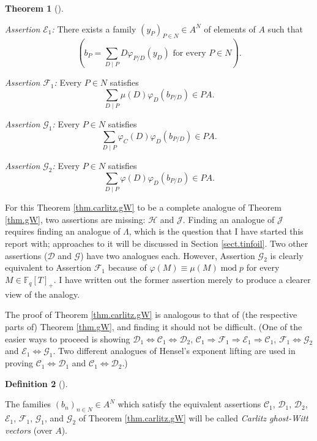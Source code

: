 \documentclass[numbers=enddot,12pt,final,onecolumn,notitlepage]{scrartcl}%
\theoremstyle{definition}
\newtheorem{theo}{Theorem}[section]
\newenvironment{theorem}[1][]
{\begin{theo}[#1]\begin{leftbar}}
{\end{leftbar}\end{theo}}
\newtheorem{defi}[theo]{Definition}
\newenvironment{definition}[1][]
{\begin{defi}[#1]\begin{leftbar}}
{\end{leftbar}\end{defi}}
\let\sumnonlimits\sum
\renewcommand{\sum}{\sumnonlimits\limits}
\begin{document}
\begin{theorem}
\textit{Assertion }$\mathcal{E}_{1}$\textit{:} There exists a family $\left(
y_{P}\right)  _{P\in N}\in A^{N}$ of elements of $A$ such that%
\[
\left(  b_{P}=\sum_{D\mid P}D\varphi_{P / D}\left(  y_{D}\right)  \text{ for
every }P\in N\right)  .
\]


\textit{Assertion }$\mathcal{F}_{1}$\textit{:} Every $P\in N$ satisfies%
\[
\sum_{D\mid P}\mu\left(  D\right)  \varphi_{D}\left(  b_{P / D}\right)  \in
PA.
\]


\textit{Assertion }$\mathcal{G}_{1}$\textit{:} Every $P\in N$ satisfies%
\[
\sum_{D\mid P}\varphi_{C}\left(  D\right)  \varphi_{D}\left(  b_{P /
D}\right)  \in PA.
\]


\textit{Assertion }$\mathcal{G}_{2}$\textit{:} Every $P\in N$ satisfies%
\[
\sum_{D\mid P}\varphi\left(  D\right)  \varphi_{D}\left(  b_{P / D}\right)
\in PA.
\]

\end{theorem}

For this Theorem \ref{thm.carlitz.gW} to be a complete analogue of Theorem
\ref{thm.gW}, two assertions are missing: $\mathcal{H}$ and $\mathcal{J}$.
Finding an analogue of $\mathcal{J}$ requires finding an analogue of $\Lambda
$, which is the question that I have started this report with; approaches to
it will be discussed in Section \ref{sect.tinfoil}. Two other assertions
($\mathcal{D}$ and $\mathcal{G}$) have two analogues each. However, Assertion
$\mathcal{G}_{2}$ is clearly equivalent to Assertion $\mathcal{F}_{1}$ because
of $\varphi\left(  M\right)  \equiv\mu\left(  M\right)  \operatorname{mod}p$
for every $M\in\mathbb{F}_{q}\left[  T\right]  _{+}$. I have written out the
former assertion merely to produce a clearer view of the analogy.

The proof of Theorem \ref{thm.carlitz.gW} is analogous to that of (the
respective parts of) Theorem \ref{thm.gW}, and finding it should not be
difficult. (One of the easier ways to proceed is showing $\mathcal{D}%
_{1}\Longleftrightarrow\mathcal{C}_{1}\Longleftrightarrow\mathcal{D}_{2}$,
$\mathcal{C}_{1}\Longrightarrow\mathcal{F}_{1}\Longrightarrow\mathcal{E}%
_{1}\Longrightarrow\mathcal{C}_{1}$, $\mathcal{F}_{1}\Longleftrightarrow
\mathcal{G}_{2}$ and $\mathcal{E}_{1}\Longleftrightarrow\mathcal{G}_{1}$. Two
different analogues of Hensel's exponent lifting are used in proving
$\mathcal{C}_{1}\Longleftrightarrow\mathcal{D}_{1}$ and $\mathcal{C}%
_{1}\Longleftrightarrow\mathcal{D}_{2}$.)

\begin{definition}
The families $\left(  b_{n}\right)  _{n\in N}\in A^{N}$ which satisfy the
equivalent assertions $\mathcal{C}_{1}$, $\mathcal{D}_{1}$, $\mathcal{D}_{2}$,
$\mathcal{E}_{1}$, $\mathcal{F}_{1}$, $\mathcal{G}_{1}$, and $\mathcal{G}_{2}$
of Theorem \ref{thm.carlitz.gW} will be called \textit{Carlitz ghost-Witt
vectors} (over $A$).
\end{definition}
\end{document}
